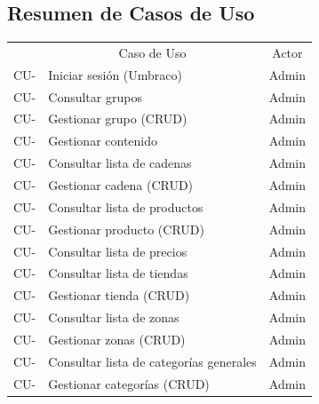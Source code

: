    \subsection{Resumen de Casos de Uso}
    \newcommand\rownumber{\stepcounter{magicrownumbers}\arabic{magicrownumbers}}
    \begin{center}
        \begin{longtable}{ | l | l | c | }
            \hline
            \rowcolor{blue!30}
            \multicolumn{1}{|c|}{ID del Caso de Uso} &
            \multicolumn{1}{|c|}{Caso de Uso} &
            \multicolumn{1}{|c|}{Actor} \\
            \hhline{===}
            \endhead

            \endfoot

           CU-\rownumber & Iniciar sesión (Umbraco) & Admin \\ \hline
           CU-\rownumber & Consultar grupos & Admin \\ \hline
           CU-\rownumber & Gestionar grupo (CRUD) & Admin \\ \hline

           CU-\rownumber & Gestionar contenido & Admin \\ \hline
           CU-\rownumber & Consultar lista de cadenas & Admin \\ \hline
           CU-\rownumber & Gestionar cadena (CRUD) & Admin \\ \hline
           CU-\rownumber & Consultar lista de productos & Admin \\ \hline
           CU-\rownumber & Gestionar producto (CRUD) & Admin \\ \hline
           CU-\rownumber & Consultar lista de precios & Admin \\ \hline
           CU-\rownumber & Consultar lista de tiendas & Admin \\ \hline
           CU-\rownumber & Gestionar tienda (CRUD) & Admin \\ \hline
           CU-\rownumber & Consultar lista de zonas & Admin \\ \hline
           CU-\rownumber & Gestionar zonas (CRUD) & Admin \\ \hline
	       CU-\rownumber & Consultar lista de categorías generales & Admin \\ \hline
           CU-\rownumber & Gestionar categorías (CRUD) & Admin \\ \hline


\end{longtable}
\end{center}
